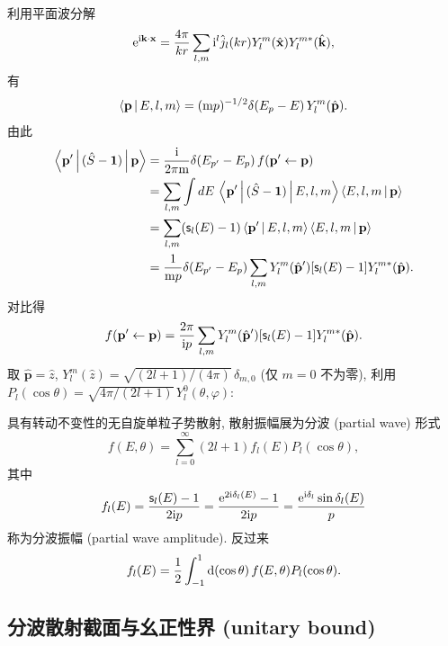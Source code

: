 利用平面波分解
\begin{equation}
\mathrm{e}^{\mathrm{i}\mathbf{k}\cdot\mathbf{x}}=\frac{4\pi}{kr}\sum_{l,m}\mathrm{i}^l\hat{j}_l(kr)Y_l^m(\hat{\mathbf{x}})Y_l^{m*}(\hat{\mathbf{k}}),
\end{equation}
有
\begin{equation}
\left\langle \mathbf{p} \,\middle|\, E,l,m \right\rangle=(\mathrm{m}p)^{-1/2}\delta(E_p-E)\,Y_l^m(\hat{\mathbf{p}}).
\end{equation}
由此
\begin{align}
\left\langle \mathbf{p}' \,\middle|\, (\hat{S}-\mathbf{1}) \,\middle|\, \mathbf{p} \right\rangle
&=\frac{\mathrm{i}}{2\pi \mathrm{m}}\delta(E_{p'}-E_p)\,f(\mathbf{p}'\leftarrow \mathbf{p}) \nonumber\\
&=\sum_{l,m}\int dE\,\left\langle \mathbf{p}' \,\middle|\, (\hat{S}-\mathbf{1}) \,\middle|\, E,l,m \right\rangle\left\langle E,l,m \,\middle|\, \mathbf{p} \right\rangle\nonumber\\
&=\sum_{l,m}(\mathsf{s}_l(E)-1)\left\langle \mathbf{p}' \,\middle|\, E,l,m \right\rangle\left\langle E,l,m \,\middle|\, \mathbf{p} \right\rangle\nonumber\\
&=\frac{1}{\mathrm{m}p}\delta(E_{p'}-E_p)\sum_{l,m}Y_l^m(\hat{\mathbf{p}}')[\mathsf{s}_l(E)-1]Y_l^{m*}(\hat{\mathbf{p}}).
\end{align}
对比得
\begin{equation}
f(\mathbf{p}'\leftarrow \mathbf{p})=\frac{2\pi}{\mathrm{i} p}\sum_{l,m}Y_l^m(\hat{\mathbf{p}}')[\mathsf{s}_l(E)-1]Y_l^{m*}(\hat{\mathbf{p}}).
\end{equation}
取 $\hat{\mathbf{p}}=\hat{z}$, $Y_l^m(\hat{z})=\sqrt{(2l+1)/(4\pi)}\,\delta_{m,0}$ (仅 $m=0$ 不为零), 利用 $P_l(\cos\theta)=\sqrt{4\pi/(2l+1)}\,Y_l^0(\theta,\varphi)$:

\begin{theorem}[分波展开]\label{thm:partial-wave}
具有转动不变性的无自旋单粒子势散射, 散射振幅展为分波 (partial wave) 形式
\begin{equation}\label{eq:partial-wave}
f(E,\theta)=\sum_{l=0}^{\infty}(2l+1)f_l(E)P_l(\cos\theta),
\end{equation}
其中
\begin{equation}\label{eq:fl}
f_l(E)=\frac{\mathsf{s}_l(E)-1}{2\mathrm{i} p}=\frac{\mathrm{e}^{2\mathrm{i}\delta_l(E)}-1}{2\mathrm{i} p}=\frac{\mathrm{e}^{\mathrm{i}\delta_l}\sin\delta_l(E)}{p}
\end{equation}
称为分波振幅 (partial wave amplitude). 反过来
\[
f_l(E)=\frac{1}{2}\int_{-1}^{1}\mathrm{d}(\cos\theta)\,f(E,\theta)P_l(\cos\theta).
\]
\end{theorem}

\subsection{分波散射截面与幺正性界 (unitary bound)}

